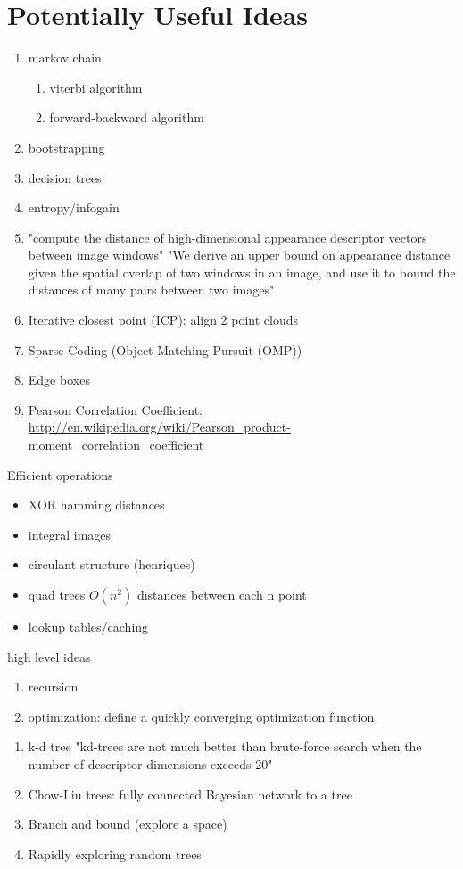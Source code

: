 \section{Potentially Useful Ideas}
\begin{enumerate}
	\item markov chain
	\begin{enumerate}
		\item viterbi algorithm
		\item forward-backward algorithm
	\end{enumerate}
	\item bootstrapping
	\item decision trees
	\item entropy/infogain
	\item "compute the distance of high-dimensional appearance descriptor vectors between image windows" "We derive an upper bound on appearance distance given the spatial overlap of two windows in an image, and use it to bound the distances of many pairs between two images" \cite{alexe2011exploiting}
	\item Iterative closest point (ICP): align 2 point clouds
    \item Sparse Coding (Object Matching Pursuit (OMP))
    \item Edge boxes \cite{zitnick2014edge}
    \item Pearson Correlation Coefficient: \url{http://en.wikipedia.org/wiki/Pearson_product-moment_correlation_coefficient}
\end{enumerate}

Efficient operations
\begin{itemize}
\item XOR hamming distances
\item integral images
\item circulant structure (henriques)
\item quad trees $O(n^2)$ distances between each n point
\item lookup tables/caching
\end{itemize}

high level ideas
\begin{enumerate}
\item recursion
\item optimization: define a quickly converging optimization function
\end{enumerate}

\begin{enumerate}
\item k-d tree "kd-trees are not much better than brute-force search when the number of descriptor dimensions exceeds 20"
\item Chow-Liu trees: fully connected Bayesian network to a tree
\item Branch and bound (explore a space)
\item Rapidly exploring random trees
\end{enumerate}




